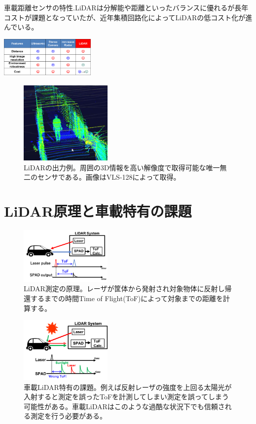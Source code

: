 \documentclass[twocolumn, 11pt, a4j]{article}
\begin{document}
\begin{table}[!t]
\centering
\caption{車載距離センサの特性.LiDARは分解能や距離といったバランスに優れるが長年コストが課題となっていたが、近年集積回路化によってLiDARの低コスト化が進んでいる。}
 \includegraphics[width=0.35\textwidth]{figs/distancesensor.png}
\label{sensor}
\end{table}

\begin{figure}[!t]
\centering
 \includegraphics[width=0.4\textwidth]{figs/pointcloud.png}
  \caption{LiDARの出力例。周囲の3D情報を高い解像度で取得可能な唯一無二のセンサである。画像はVLS-128によって取得。}
\label{lidarpoints}
\end{figure}

\section{LiDAR原理と車載特有の課題}
\begin{figure}[!t]
\centering
 \includegraphics[width=0.4\textwidth]{figs/lidar.png}
  \caption{LiDAR測定の原理。レーザが筐体から発射され対象物体に反射し帰還するまでの時間Time of Flight(ToF)によって対象までの距離を計算する。}
\label{lidar}
\end{figure}

\begin{figure}[!t]
\centering
 \includegraphics[width=0.4\textwidth]{figs/sunlight.png}
  \caption{車載LiDAR特有の課題。例えば反射レーザの強度を上回る太陽光が入射すると測定を誤ったToFを計測してしまい測定を誤ってしまう可能性がある。車載LiDARはこのような過酷な状況下でも信頼される測定を行う必要がある。}
\label{sunlight}
\end{figure}
\end{document}
